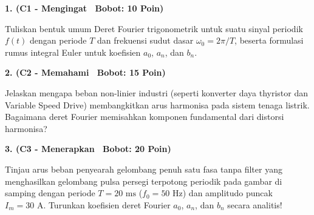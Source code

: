 \documentclass[10pt,a4paper]{article}
\begin{document}
\par
\vspace{1mm}

\noindent\textbf{1. (C1 - Mengingat \textbar\ Bobot: 10 Poin)}\par\vspace{0.8mm}
{\footnotesize Tuliskan bentuk umum Deret Fourier trigonometrik untuk suatu sinyal periodik $f(t)$ dengan periode $T$ dan frekuensi sudut dasar $\omega_0 = 2\pi/T$, beserta formulasi rumus integral Euler untuk koefisien $a_0$, $a_n$, dan $b_n$.}\par

\vspace{2.5mm}

\noindent\textbf{2. (C2 - Memahami \textbar\ Bobot: 15 Poin)}\par\vspace{0.8mm}
{\footnotesize Jelaskan mengapa beban non-linier industri (seperti konverter daya thyristor dan Variable Speed Drive) membangkitkan arus harmonisa pada sistem tenaga listrik. Bagaimana deret Fourier memisahkan komponen fundamental dari distorsi harmonisa?}\par

\vspace{2.5mm}

\noindent\textbf{3. (C3 - Menerapkan \textbar\ Bobot: 20 Poin)}\par\vspace{0.8mm}
\noindent\begin{minipage}[t]{0.60\textwidth}%
  {\footnotesize Tinjau arus beban penyearah gelombang penuh satu fasa tanpa filter yang menghasilkan gelombang pulsa persegi terpotong periodik pada gambar di samping dengan periode $T=20\text{ ms}$ ($f_0 = 50\text{ Hz}$) dan amplitudo puncak $I_m = 30\text{ A}$. Turunkan koefisien deret Fourier $a_0$, $a_n$, dan $b_n$ secara analitis!}%
\end{minipage}%
\hfill%
\begin{minipage}[t]{0.37\textwidth}%
  \centering
\end{minipage}\par
\end{document}
